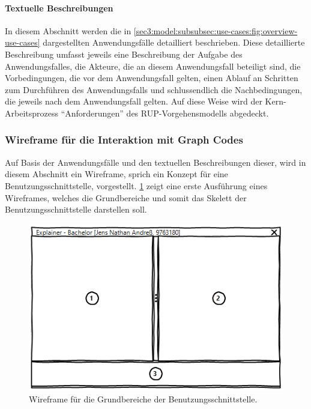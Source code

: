\paragraph{Textuelle Beschreibungen}
\label{sec3:model:par:textual-desc-use-cases}
In diesem Abschnitt werden die in \cref{sec3:model:subsubsec:use-cases:fig:overview-use-cases} dargestellten Anwendungsfälle detailliert beschrieben.
Diese detaillierte Beschreibung umfasst jeweils eine Beschreibung der Aufgabe des Anwendungsfalles, die Akteure, die an diesem Anwendungsfall beteiligt sind, die Vorbedingungen, die vor dem Anwendungsfall gelten, einen Ablauf an Schritten zum Durchführen des Anwendungsfalls und schlussendlich die Nachbedingungen, die jeweils nach dem Anwendungsfall gelten.
Auf diese Weise wird der Kern-Arbeitsprozess \enquote{Anforderungen} des RUP-Vorgehensmodells abgedeckt.



\subsubsection{Wireframe für die Interaktion mit Graph Codes}
\label{sec3:model:par:wireframe}
Auf Basis der Anwendungsfälle und den textuellen Beschreibungen dieser, wird in diesem Abschnitt ein Wireframe, sprich ein Konzept für eine Benutzungsschnittstelle, vorgestellt.
\cref{sec3:model:par:wireframe:fig:stage-1} zeigt eine erste Ausführung eines Wireframes, welches die Grundbereiche und somit das Skelett der Benutzungsschnittstelle darstellen soll.

\begin{figure}[htb]
    \centering
    \includegraphics{chapter/chapter_3/wireframe-stage-1.png}
    \caption{Wireframe für die Grundbereiche der Benutzungsschnittstelle.}
    \label{sec3:model:par:wireframe:fig:stage-1}
\end{figure}

